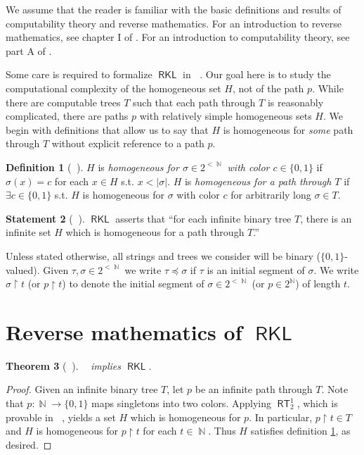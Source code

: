\documentclass{amsart}
\theoremstyle{plain}
\newtheorem{theorem}{Theorem}
\theoremstyle{remark}
\theoremstyle{definition}
\newtheorem{defn}[theorem]{Definition}
\newtheorem{statement}[theorem]{Statement}
\DeclareMathOperator{\RCA}{\mathsf{RCA}_0}
\DeclareMathOperator{\RT}{\mathsf{RT}}
\DeclareMathOperator{\WKL}{\mathsf{WKL}_0}
\DeclareMathOperator{\RKL}{\mathsf{RKL}}
\DeclareMathOperator{\N}{\mathbb{N}}
\begin{document}
We assume that the reader is familiar with the basic definitions and results of computability theory and reverse mathematics.  
For an introduction to reverse mathematics, see chapter I of \cite{simpson}.  
For an introduction to computability theory, see part A of \cite{soare}.

Some care is required to formalize $\RKL$ in $\RCA$.  
Our goal here is to study the computational complexity of the homogeneous set $H$, not of the path $p$.  
While there are computable trees $T$ such that each path through $T$ is reasonably complicated,
	there are paths $p$ with relatively simple homogeneous sets $H$.  
We begin with definitions that allow us to say that $H$ is homogeneous for \emph{some} path through $T$ without explicit reference to a path $p$.  

\begin{defn}[$\RCA$]
\label{defn.homog-for-path}
	$H$ is \emph{homogeneous for $\sigma\in 2^{<\N}$ with color $c\in\{0,1\}$} if 
$\sigma(x)=c$ for each $x\in H$ s.t. $x<|\sigma|$.
	$H$ is \emph{homogeneous for a path through $T$} if $\exists c\in\{0,1\}$ s.t. 
		$H$ is homogeneous for $\sigma$ with color $c$ for arbitrarily long $\sigma\in T$.
\end{defn}

\begin{statement}[$\RCA$]
\label{statement.RKL}
$\RKL$ asserts that 
	``for each infinite binary tree $T$, there is an
	infinite set $H$ which is homogeneous for a path through $T$.''	
\end{statement}

Unless stated otherwise, all strings and trees we consider will be binary ($\{0,1\}$-valued). 
Given $\tau,\sigma\in 2^{<\N}$ we write $\tau\preceq\sigma$ if $\tau$ is an initial segment of $\sigma$.  We write $\sigma\upharpoonright t$ (or $p\upharpoonright t$) to denote the initial segment of $\sigma\in 2^{<\N}$ (or $p\in 2^{\N}$) of length $t$.  


\section{Reverse mathematics of \texorpdfstring{$\RKL$}{RKL}}

\begin{theorem}[$\RCA$]
$\WKL$ implies $\RKL$.
\end{theorem}

\begin{proof}
Given an infinite binary tree $T$, let $p$ be an infinite path through $T$.  Note that $p:\N\rightarrow\{0,1\}$ maps singletons into two colors.  Applying $\RT^1_2$, which is provable in $\RCA$, yields a set $H$ which is homogeneous for $p$.  In particular, $p\upharpoonright t\in T$ and $H$ is homogeneous for $p\upharpoonright t$ for each $t\in\N$.  Thus $H$ satisfies definition \ref{defn.homog-for-path}, as desired. 
\end{proof}
\end{document}
